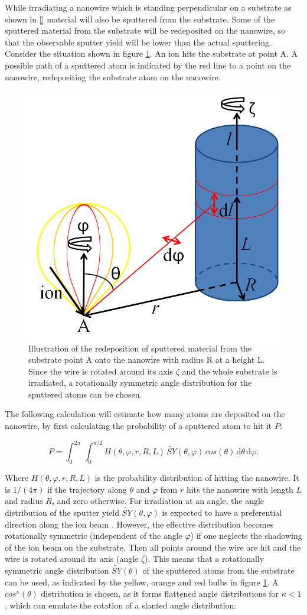 While irradiating a nanowire which is standing perpendicular on a substrate as shown in \ref{} material will also be sputtered from the substrate. Some of the sputtered material from the substrate will be redeposited on the nanowire, so that the observable sputter yield will be lower than the actual sputtering. Consider the situation shown in figure \ref{redeposit}. An ion hits the substrate at point A. A possible path of a sputtered atom is indicated by the red line to a point on the nanowire, redepositing the substrate atom on the nanowire. 

\begin{figure}
	\centering
		\includegraphics[width=.4\textwidth]{images/redeposit.jpg}
	\caption{Illustration of the redeposition of sputtered material from the substrate point A onto the nanowire with radius R at a height L. Since the wire is rotated around its axis $\zeta$ and the whole substrate is irradiated, a rotationally symmetric angle distribution for the sputtered atoms can be chosen.} 
	\label{redeposit}
\end{figure}

The following calculation will estimate how many atoms are deposited on the nanowire, by first calculating the probability of a sputtered atom to hit it $P$:

\begin{equation}
\label{prob1}
P = \int_0^{2\pi} \! \,\int_0^{\pi/2} \!\! H(\theta,\varphi,r,R,L) \, \tilde{SY}(\theta,\varphi) \,cos(\theta)\,\mathrm{d}\theta \, \mathrm{d}\varphi.
\end{equation}

Where $H(\theta,\varphi,r,R,L)$ is the probability distribution of hitting the nanowire. It is $1/(4\pi)$ if the trajectory along $\theta$ and $\varphi$ from $r$ hits the nanowire with length $L$ and radius $R$, and zero otherwise. For irradiation at an angle, the angle distribution of the sputter yield $\tilde{SY}(\theta,\varphi)$ is expected to have a preferential direction along the ion beam \cite{verdeil_angular_2008}. However, the effective distribution becomes rotationally symmetric (independent of the angle $\varphi$) if one neglects the shadowing of the ion beam on the substrate. Then all points around the wire are hit and the wire is rotated around its axis (angle $\zeta$). This means that a rotationally symmetric angle distribution $\tilde{SY}(\theta)$ of the sputtered atoms from the substrate can be used, as indicated by the yellow, orange and red bulbs in figure \ref{redeposit}. A $cos^\kappa(\theta)$ distribution is chosen, as it forms flattened angle distributions for $\kappa < 1$, which can emulate the rotation of a slanted angle distribution: 

